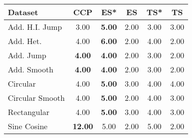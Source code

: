 \begin{tabular}{lccccc}
\toprule
Dataset & CCP & ES* & ES & TS* & TS \\
\midrule
Add. H.I. Jump & 3.00 & \textbf{5.00} & 2.00 & 3.00 & 3.00 \\
Add. Het. & 4.00 & \textbf{6.00} & 2.00 & 4.00 & 2.00 \\
Add. Jump & \textbf{4.00} & \textbf{4.00} & 2.00 & 3.00 & 2.00 \\
Add. Smooth & \textbf{4.00} & \textbf{4.00} & 2.00 & 3.00 & 2.00 \\
Circular & 4.00 & \textbf{5.00} & 3.00 & 4.00 & 4.00 \\
Circular Smooth & 4.00 & \textbf{5.00} & 2.00 & 4.00 & 3.00 \\
Rectangular & 4.00 & \textbf{5.00} & 3.00 & 4.00 & 3.00 \\
Sine Cosine & \textbf{12.00} & 5.00 & 2.00 & 5.00 & 2.00 \\
\bottomrule
\end{tabular}